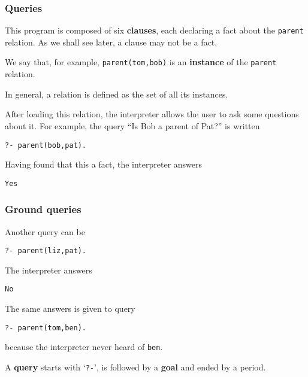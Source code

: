 %
\begin{frame}[containsverbatim]
\frametitle{Queries}

This program is composed of six \textbf{clauses}, each declaring a
fact about the \texttt{parent} relation. As we shall see later,
a clause may not be a fact.

\bigskip

We say that, for example, \texttt{parent(tom,bob)} is an
\textbf{instance} of the \texttt{parent} relation.

\bigskip

In general, a relation is defined as the set of all its instances.

\bigskip

After loading this relation, the \Prolog interpreter allows the user
to ask some questions about it. For example, the query ``Is Bob a
parent of Pat?'' is written 
{\small
\begin{verbatim}
?- parent(bob,pat).
\end{verbatim}
}
Having found that this a fact, the interpreter answers
{\small
\begin{verbatim}
Yes
\end{verbatim}
}

\end{frame}

%
\begin{frame}[containsverbatim]
\frametitle{Ground queries}

Another query can be
{\small
\begin{verbatim}
?- parent(liz,pat).
\end{verbatim}
}
The interpreter answers
{\small
\begin{verbatim}
No
\end{verbatim}
}
The same answers is given to query
{\small
\begin{verbatim}
?- parent(tom,ben).
\end{verbatim}
}
because the interpreter never heard of \texttt{ben}.

\bigskip

A \textbf{query} starts with `\verb+?-+', is followed by a
\textbf{goal} and ended by a period.

\end{frame}

